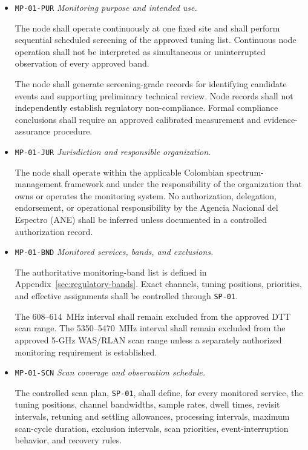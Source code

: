 \documentclass[11pt,a4paper]{article}
\begin{document}
	\begin{itemize}[leftmargin=*]
		
		\item \texttt{MP-01-PUR} \emph{Monitoring purpose and intended use.}
		
		The node shall operate continuously at one fixed site and shall perform
		sequential scheduled screening of the approved tuning list. Continuous
		node operation shall not be interpreted as simultaneous or uninterrupted
		observation of every approved band.
		
		The node shall generate screening-grade records for identifying candidate
		events and supporting preliminary technical review. Node records shall not
		independently establish regulatory non-compliance. Formal compliance
		conclusions shall require an approved calibrated measurement and
		evidence-assurance procedure.
		
		\item \texttt{MP-01-JUR} \emph{Jurisdiction and responsible organization.}
		
		The node shall operate within the applicable Colombian
		spectrum-management framework and under the responsibility of the
		organization that owns or operates the monitoring system. No authorization,
		delegation, endorsement, or operational responsibility by the Agencia
		Nacional del Espectro (ANE) shall be inferred unless documented in a
		controlled authorization record.
		
		\item \texttt{MP-01-BND} \emph{Monitored services, bands, and exclusions.}
		
		The authoritative monitoring-band list is defined in
		Appendix~\ref{sec:regulatory-bands}. Exact channels, tuning positions,
		priorities, and effective assignments shall be controlled through
		\texttt{SP-01}.
		
		The 608--614~MHz interval shall remain excluded from the approved DTT scan
		range. The 5350--5470~MHz interval shall remain excluded from the approved
		5-GHz WAS/RLAN scan range unless a separately authorized monitoring
		requirement is established.
		
		\item \texttt{MP-01-SCN} \emph{Scan coverage and observation schedule.}
		
		The controlled scan plan, \texttt{SP-01}, shall define, for every monitored
		service, the tuning positions, channel bandwidths, sample rates, dwell
		times, revisit intervals, retuning and settling allowances, processing
		intervals, maximum scan-cycle duration, exclusion intervals, scan
		priorities, event-interruption behavior, and recovery rules.
		

\end{itemize}
\end{document}
